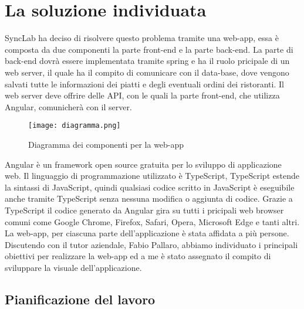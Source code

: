 \section{La soluzione individuata}
SyncLab ha deciso di risolvere questo problema tramite una web-app, essa è composta da due componenti la parte front-end e la parte back-end. La parte di back-end dovrà essere implementata tramite spring e ha il ruolo pricipale di un web server, il quale ha il compito di comunicare con il data-base, dove vengono salvati tutte le informazioni dei piatti e degli eventuali ordini dei ristoranti. Il web server deve offrire delle API, con le quali la parte front-end, che utilizza Angular, comunicherà con il server.
\begin{figure}[H]
    \centering
    \texttt{[image: diagramma.png]}
    \caption{Diagramma dei componenti per la web-app}
\end{figure}
Angular è un framework open source gratuita per lo sviluppo di applicazione web. Il linguaggio di programmazione utilizzato è TypeScript, TypeScript estende la sintassi di JavaScript, quindi qualsiasi codice scritto in JavaScript è eseguibile anche tramite TypeScript senza nessuna modifica o aggiunta di codice. Grazie a TypeScript il codice generato da Angular gira su tutti i pricipali web browser comuni come Google Chrome, Firefox, Safari, Opera, Microsoft Edge e tanti altri. La web-app, per ciascuna parte dell'applicazione è stata affidata a più persone. Discutendo con il tutor aziendale, Fabio Pallaro, abbiamo individuato i principali obiettivi per realizzare la web-app ed a me è stato assegnato il compito di sviluppare la visuale dell'applicazione. 

\subsection{Pianificazione del lavoro}

